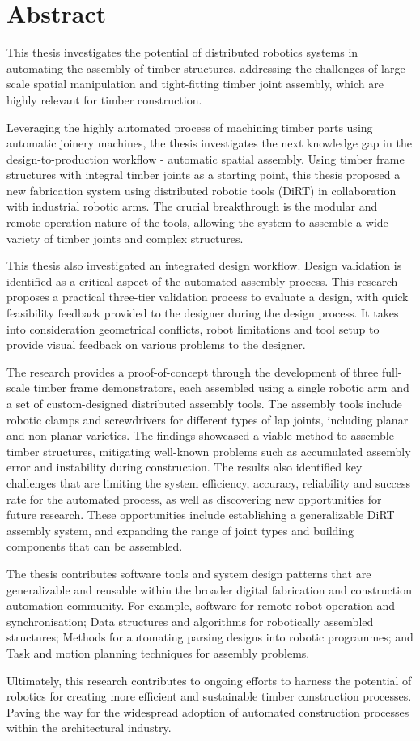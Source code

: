 \section*{Abstract}
This thesis investigates the potential of distributed robotics systems in automating the assembly of timber structures, addressing the challenges of large-scale spatial manipulation and tight-fitting timber joint assembly, which are highly relevant for timber construction.

Leveraging the highly automated process of machining timber parts using automatic joinery machines, the thesis investigates the next knowledge gap in the design-to-production workflow - automatic spatial assembly.
 Using timber frame structures with integral timber joints as a starting point, this thesis proposed a new fabrication system using distributed robotic tools (DiRT) in collaboration with industrial robotic arms.
 The crucial breakthrough is the modular and remote operation nature of the tools, allowing the system to assemble a wide variety of timber joints and complex structures.

This thesis also investigated an integrated design workflow.
 Design validation is identified as a critical aspect of the automated assembly process.
 This research proposes a practical three-tier validation process to evaluate a design, with quick feasibility feedback provided to the designer during the design process.
 It takes into consideration geometrical conflicts, robot limitations and tool setup to provide visual feedback on various problems to the designer.
 
The research provides a proof-of-concept through the development of three full-scale timber frame demonstrators, each assembled using a single robotic arm and a set of custom-designed distributed assembly tools.
 The assembly tools include robotic clamps and screwdrivers for different types of lap joints, including planar and non-planar varieties.
 The findings showcased a viable method to assemble timber structures, mitigating well-known problems such as accumulated assembly error and instability during construction.
 The results also identified key challenges that are limiting the system efficiency, accuracy, reliability and success rate for the automated process, as well as discovering new opportunities for future research.
 These opportunities include establishing a generalizable DiRT assembly system, and expanding the range of joint types and building components that can be assembled.

The thesis contributes software tools and system design patterns that are generalizable and reusable within the broader digital fabrication and construction automation community.
 For example, software for remote robot operation and synchronisation; Data structures and algorithms for robotically assembled structures; Methods for automating parsing designs into robotic programmes; and Task and motion planning techniques for assembly problems.

Ultimately, this research contributes to ongoing efforts to harness the potential of robotics for creating more efficient and sustainable timber construction processes.
 Paving the way for the widespread adoption of automated construction processes within the architectural industry.

